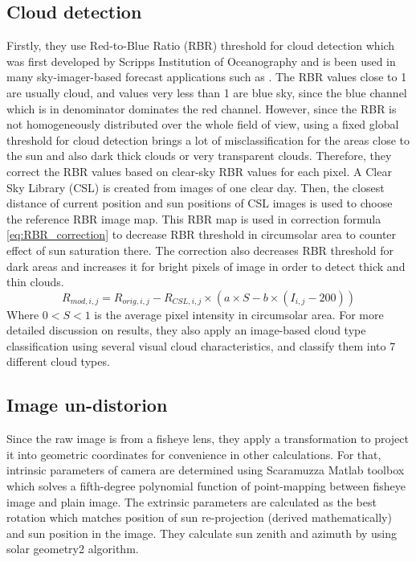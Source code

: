 \subsection{Cloud detection}
Firstly, they use Red-to-Blue Ratio (RBR) threshold for cloud detection which was first developed by Scripps Institution of Oceanography \cite{RBR89, RBR98} and is been used in many sky-imager-based forecast applications such as \cite{cloud_detection_using_RBR}. The RBR values close to 1 are usually cloud, and values very less than 1 are blue sky, since the blue channel which is in denominator dominates the red channel. However, since the RBR is not homogeneously distributed over the whole field of view, using a fixed global threshold for cloud detection brings a lot of misclassification for the areas close to the sun and also dark thick clouds or very transparent clouds. Therefore, they correct the RBR values based on clear-sky RBR values for each pixel. A Clear Sky Library (CSL) is created from images of one clear day. Then, the closest distance of current position and sun positions of CSL images is used to choose the reference RBR image map. This RBR map is used in correction formula \ref{eq:RBR_correction} to decrease RBR threshold in circumsolar area to counter effect of sun saturation there. The correction also decreases RBR threshold for dark areas and increases it for bright pixels of image in order to detect thick and thin clouds.
\begin{equation}
\label{eq:RBR_correction}
R_{mod,i,j} = R_{orig,i,j} - R_{CSL,i,j} \times (a \times S - b \times (I_{i,j} - 200))
\end{equation}
Where $0<S<1$ is the average pixel intensity in circumsolar area. For more detailed discussion on results, they also apply an image-based cloud type classification using several visual cloud characteristics, and classify them into 7 different cloud types.

\subsection{Image un-distorion}
\label{sec:image_undistortion_schmidt}
Since the raw image is from a fisheye lens, they apply a transformation to project it into geometric coordinates for convenience in other calculations. For that, intrinsic parameters of camera are determined using Scaramuzza Matlab toolbox \cite{fisheye_undistort} which solves a fifth-degree polynomial function of point-mapping between fisheye image and plain image. The extrinsic parameters are calculated as the best rotation which matches position of sun re-projection (derived mathematically) and sun position in the image. They calculate sun zenith and azimuth by using solar geometry2 algorithm\cite{sun_pos1}.

